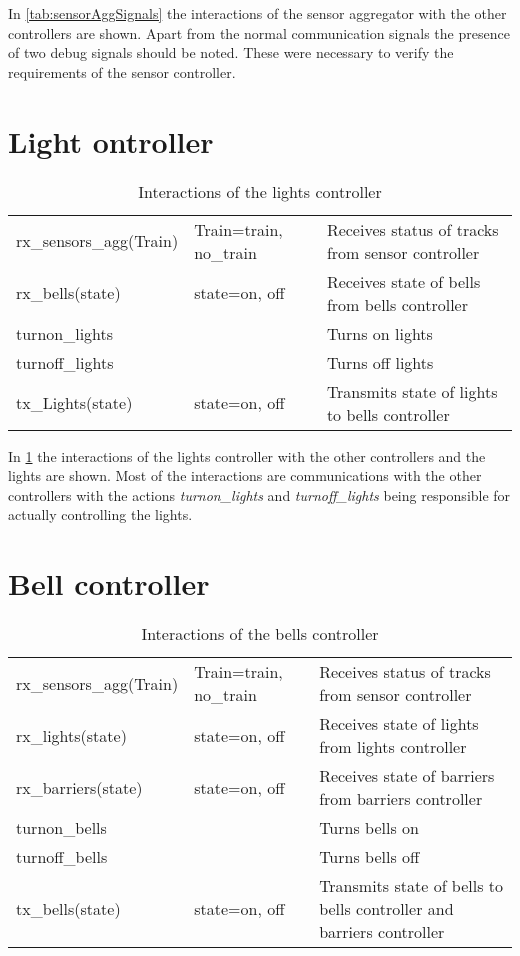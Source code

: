 \documentclass[final]{report}
\begin{document}
In \cref{tab:sensorAggSignals} the interactions of the sensor aggregator with the other controllers are shown.
Apart from the normal communication signals the presence of two debug signals should be noted.
These were necessary to verify the requirements of the sensor controller.

\section{Light ontroller}
\begin{table}[H]
\centering
\begin{tabular}{|l|l|l|}
\hline
rx\_sensors\_agg(Train)  & Train=train, no\_train & Receives status of tracks from sensor controller \\
rx\_bells(state)   & state=on, off          & Receives state of bells from bells controller               \\ \hline
turnon\_lights &         & Turns on lights                                     \\
turnoff\_lights & & Turns off lights\\
tx\_Lights(state)  & state=on, off          & Transmits state of lights to bells controller               \\ \hline
\end{tabular}
\caption{Interactions of the lights controller}
\label{tab:lightsSignals}
\end{table}

In \cref{tab:lightsSignals} the interactions of the lights controller with the other controllers and the lights are shown.
Most of the interactions are communications with the other controllers with the actions \textit{turnon\_lights} and \textit{turnoff\_lights} being responsible for actually controlling the lights.

\section{Bell controller}
\begin{table}[H]
\centering
\begin{tabular}{|l|l|l|}
\hline
rx\_sensors\_agg(Train)   & Train=train, no\_train & Receives status of tracks from sensor controller           \\
rx\_lights(state)   & state=on, off          & Receives state of lights from lights controller                      \\
rx\_barriers(state) & state=on, off          & Receives state of barriers from barriers controller                  \\ \hline
turnon\_bells   &          & Turns bells on                                              \\
turnoff\_bells   &          & Turns bells off                                              \\
tx\_bells(state)    & state=on, off          & Transmits state of bells to bells controller and barriers controller\\ \hline
\end{tabular}
\caption{Interactions of the bells controller}
\label{tab:bellsSignals}
\end{table}
\end{document}
